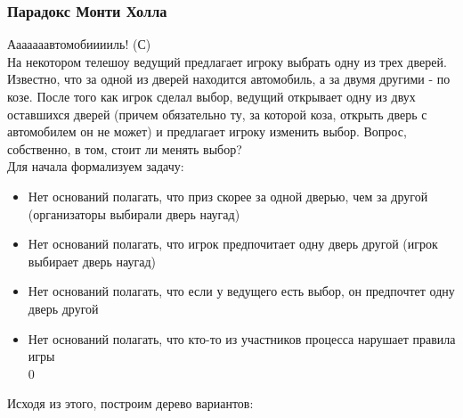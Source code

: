 \subsubsection{Парадокс Монти Холла}
Ааааааавтомобииииль! (С)\\
На некотором телешоу ведущий предлагает игроку выбрать одну из трех дверей. Известно, что за одной из дверей находится автомобиль, а за двумя другими - по козе. После того как игрок сделал выбор, ведущий открывает одну из двух оставшихся дверей (причем обязательно ту, за которой коза, открыть дверь с автомобилем он не может) и предлагает игроку изменить выбор. Вопрос, собственно, в том, стоит ли менять выбор?\\
Для начала формализуем задачу:\\
\begin{itemize}
\item Нет оснований полагать, что приз скорее за одной дверью, чем за другой (организаторы выбирали дверь наугад)\\
\item Нет оснований полагать, что игрок предпочитает одну дверь другой (игрок выбирает дверь наугад)\\
\item Нет оснований полагать, что если у ведущего есть выбор, он предпочтет одну дверь другой\\
\item Нет оснований полагать, что кто-то из участников процесса нарушает правила игры\\0
\end{itemize}
Исходя из этого, построим дерево вариантов:\\
